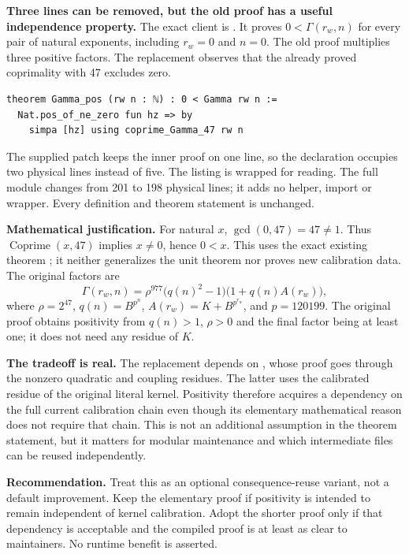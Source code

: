 \textbf{Three lines can be removed, but the old proof has a useful independence property.}
The exact client is . It proves
$0<\Gamma(r_w,n)$ for every pair of natural exponents, including $r_w=0$ and $n=0$.
The old proof multiplies three positive factors. The replacement observes that the already proved coprimality with 47 excludes zero.

\begin{lstlisting}
theorem Gamma_pos (rw n : ℕ) : 0 < Gamma rw n :=
  Nat.pos_of_ne_zero fun hz => by
    simpa [hz] using coprime_Gamma_47 rw n
\end{lstlisting}

The supplied patch keeps the inner proof on one line, so the declaration occupies two physical lines instead of five. The listing is wrapped for reading. The full module changes from 201 to 198 physical lines; it adds no helper, import or wrapper. Every definition and theorem statement is unchanged.

\textbf{Mathematical justification.} For natural $x$, $\gcd(0,47)=47\ne1$.
Thus $\operatorname{Coprime}(x,47)$ implies $x\ne0$, hence $0<x$. This uses the exact existing theorem ; it neither generalizes the unit theorem nor proves new calibration data. The original factors are
\[
  \Gamma(r_w,n)=\rho^{977}\bigl(q(n)^2-1\bigr)
    \bigl(1+q(n)A(r_w)\bigr),
\]
where $\rho=2^{47}$, $q(n)=B^{p^n}$, $A(r_w)=K+B^{p^{r_w}}$, and $p=120199$.
The original proof obtains positivity from $q(n)>1$, $\rho>0$ and the final factor being at least one; it does not need any residue of $K$.

\textbf{The tradeoff is real.} The replacement depends on , whose proof goes through the nonzero quadratic and coupling residues. The latter uses the calibrated residue of the original literal kernel. Positivity therefore acquires a dependency on the full current calibration chain even though its elementary mathematical reason does not require that chain. This is not an additional assumption in the theorem statement, but it matters for modular maintenance and which intermediate files can be reused independently.

\textbf{Recommendation.} Treat this as an optional consequence-reuse variant, not a default improvement. Keep the elementary proof if positivity is intended to remain independent of kernel calibration. Adopt the shorter proof only if that dependency is acceptable and the compiled proof is at least as clear to maintainers. No runtime benefit is asserted.

